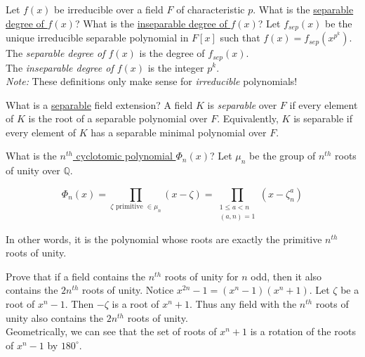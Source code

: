 \documentclass[avery5371,grid]{flashcards}
\newcommand{\Q}{\mathbb{Q}}
\begin{document}
\begin{flashcard}[Fields]{Let $f(x)$ be irreducible over a field $F$ of characteristic $p$. What is the \underline{separable degree of $f(x)$}? What is the \underline{inseparable degree of $f(x)$}?}
 Let $f_{sep}(x)$ be the unique irreducible separable polynomial in $F[x]$ such that $f(x) = f_{sep}\left (x^{p^k} \right )$. \\
 
 The \emph{separable degree of $f(x)$} is the degree of $f_{sep}(x)$. \\
 
 The \emph{inseparable degree of $f(x)$} is the integer $p^k$. \\
 
 \emph{Note: }These definitions only make sense for \emph{irreducible} polynomials!
\end{flashcard}

\begin{flashcard}[Fields]{What is a \underline{separable} field extension?}
 A field $K$ is \emph{separable} over $F$ if every element of $K$ is the root of a separable polynomial over $F$. Equivalently, $K$ is separable if every element of $K$ has a separable minimal polynomial over $F$.
\end{flashcard}

\begin{flashcard}[Fields]{What is the \underline{$n^{th}$ cyclotomic polynomial $\Phi_n(x)$}?}
Let $\mu_n$ be the group of $n^{th}$ roots of unity over $\Q$.

 $$\Phi_n(x) = \prod_{\zeta \text{ primitive } \in \mu_n} (x - \zeta) = \prod_{\substack{1 \leq a < n \\ (a,n)=1}} (x - \zeta_n^a)$$
 
 In other words, it is the polynomial whose roots are exactly the primitive $n^{th}$ roots of unity.
\end{flashcard}

\begin{flashcard}[Fields]{Prove that if a field contains the $n^{th}$ roots of unity for $n$ odd, then it also contains the $2n^{th}$ roots of unity.}
 Notice $x^{2n} - 1 = (x^n - 1)(x^n + 1)$. Let $\zeta$ be a root of $x^n - 1$. Then $- \zeta$ is a root of $x^n + 1$. Thus any field with the $n^{th}$ roots of unity also contains the $2n^{th}$ roots of unity. \\
 
 Geometrically, we can see that the set of roots of $x^n + 1$ is a rotation of the roots of $x^n - 1$ by $180^\circ$.
\end{flashcard}
\end{document}
